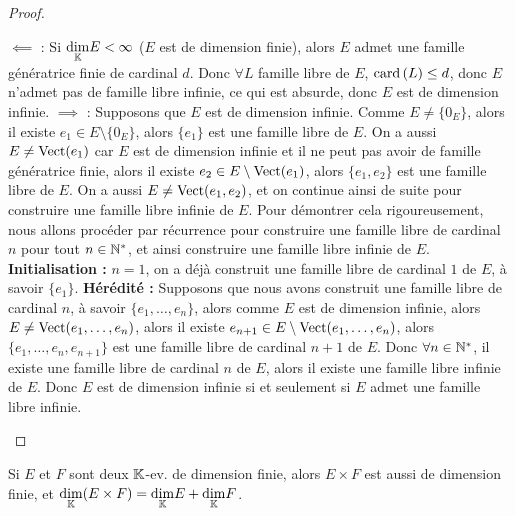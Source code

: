 \documentclass[12pt,a4paper]{report}
\begin{document}
\begin{proof}
    \begin{outline}
        \1 $\impliedby$ : Si $\underset{\mathbb{K}}\dim E < \infty$ ($E$ est de dimension finie), alors $E$ admet une famille génératrice finie de cardinal $d$. Donc $\forall L$ famille libre de $E$, $\mathrm{card}\left(L\right) \le d$, donc $E$ n'admet pas de famille libre infinie, ce qui est absurde, donc $E$ est de dimension infinie.
        \1 $\implies$ : Supposons que $E$ est de dimension infinie.
            \2 Comme $E \ne \{0_E\}$, alors il existe $e_1 \in E\setminus\{0_E\}$, alors $\{e_1\}$ est une famille libre de $E$.
            \2 On a aussi $E \ne \mathrm{Vect}(e_1)$ car $E$ est de dimension infinie et il ne peut pas avoir de famille génératrice finie, alors il existe $e_2 \in E\setminus\mathrm{Vect}(e_1)$, alors $\{e_1,e_2\}$ est une famille libre de $E$.
            \2 On a aussi $E \ne \mathrm{Vect}(e_1,e_2)$, et on continue ainsi de suite pour construire une famille libre infinie de $E$.
            \2 Pour démontrer cela rigoureusement, nous allons procéder par récurrence pour construire une famille libre de cardinal $n$ pour tout $n \in \mathbb{N}^*$, et ainsi construire une famille libre infinie de $E$.
                \3 \textbf{Initialisation :} $n=1$, on a déjà construit une famille libre de cardinal $1$ de $E$, à savoir $\{e_1\}$.
                \3 \textbf{Hérédité :} Supposons que nous avons construit une famille libre de cardinal $n$, à savoir $\{e_1,\dots,e_n\}$, alors comme $E$ est de dimension infinie, alors $E \ne \mathrm{Vect}(e_1,\dots,e_n)$, alors il existe $e_{n+1} \in E\setminus\mathrm{Vect}(e_1,\dots,e_n)$, alors $\{e_1,\dots,e_n,e_{n+1}\}$ est une famille libre de cardinal $n+1$ de $E$.
            \2 Donc $\forall n \in \mathbb{N}^*$, il existe une famille libre de cardinal $n$ de $E$, alors il existe une famille libre infinie de $E$.
        \1 Donc $E$ est de dimension infinie si et seulement si $E$ admet une famille libre infinie.
    \end{outline}
\end{proof}

\begin{property}
    Si $E$ et $F$ sont deux $\mathbb{K}$-ev. de dimension finie, alors $E\times F$ est aussi de dimension finie, et $\underset{\mathbb{K}}\dim (E\times F) = \underset{\mathbb{K}}\dim E + \underset{\mathbb{K}}\dim F$.
\end{property}
\end{document}
